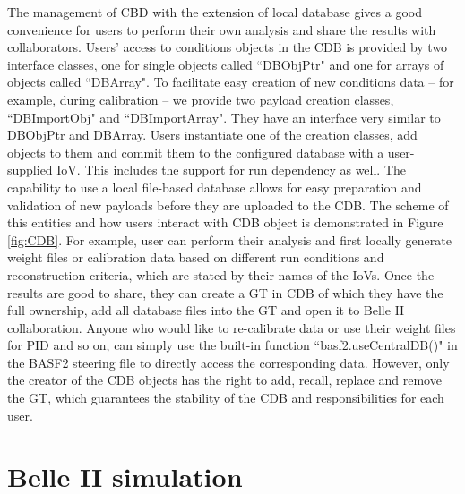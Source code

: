 The management of CBD with the extension of local database gives a good convenience for users to perform their own analysis and share the results with collaborators.
Users' access to conditions objects in the CDB is
provided by two interface classes, one for single objects
called ``DBObjPtr" and one for arrays of objects called
``DBArray". To facilitate easy creation of new conditions data – for example, during calibration – we provide two payload creation classes, ``DBImportObj" and ``DBImportArray". They
have an interface very similar to DBObjPtr and DBArray\cite{BASF2}.
Users instantiate one of the creation classes, add objects
 to them and commit them to the configured database with a user-supplied IoV. This includes the support for run dependency as well. The capability to use a local file-based
 database allows for easy preparation and validation of
new payloads before they are uploaded to the CDB. The scheme of this entities and how users interact with CDB object is demonstrated in Figure \ref{fig:CDB}. For example, user can perform their analysis and first locally generate weight files or calibration data based on different run conditions and reconstruction criteria, which are stated by their names of the IoVs. Once the results are good to share, they can create a GT in CDB of which they have the full ownership, add all database files into the GT and open it to Belle II collaboration. Anyone who would like to re-calibrate data or use their weight files for PID and so on, can simply use the built-in function ``basf2.useCentralDB()" in the BASF2 steering file to directly access the corresponding data. However, only the creator of the CDB objects has the right to add, recall, replace and remove the GT, which guarantees the stability of the CDB and responsibilities for each user.


\begin{comment}
\subsection{Summary}
BASF2 has been developed for an emphasis on providing reliable and high quality performance for Belle II analysis. It satisfies the most of demanding requirements of data taking, simulation, reconstruction, and offline analysis. 
\end{comment}

\section{Belle II simulation}

